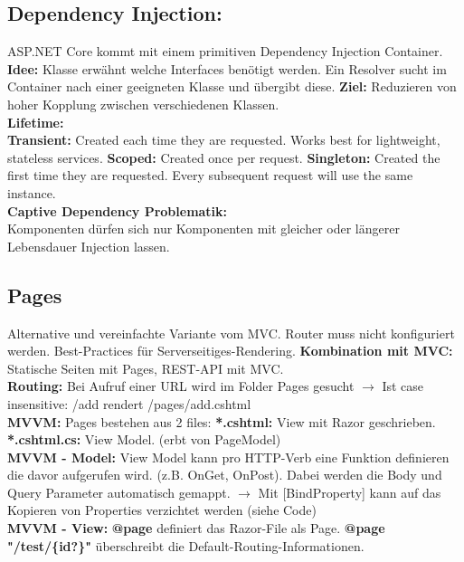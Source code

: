 \subsection{Dependency Injection:}
ASP.NET Core kommt mit einem primitiven Dependency Injection Container. \textbf{Idee:} Klasse erwähnt welche Interfaces benötigt werden. Ein Resolver sucht im Container nach einer geeigneten Klasse und übergibt diese. \textbf{Ziel:} Reduzieren von hoher Kopplung zwischen verschiedenen Klassen.\\
\textcolor{b}{\textbf{Lifetime:}}\\
\textbf{Transient:} Created each time they are requested. Works best for lightweight, stateless services. \textbf{Scoped:} Created once per request. \textbf{Singleton:} Created the first time they are requested. Every subsequent request will use the same instance.\\
\textcolor{b}{\textbf{Captive Dependency Problematik:}}\\
Komponenten dürfen sich nur Komponenten mit gleicher oder längerer Lebensdauer Injection lassen.
\subsection{Pages}
Alternative und vereinfachte Variante vom MVC. Router muss nicht konfiguriert werden. Best-Practices für Serverseitiges-Rendering. \textbf{Kombination mit MVC:} Statische Seiten mit Pages, REST-API mit MVC.\\
\textcolor{b}{\textbf{Routing:}} Bei Aufruf einer URL wird im Folder Pages gesucht $\rightarrow$ Ist case insensitive: \textcolor{b}{/add} rendert \textcolor{b}{/pages/add.cshtml}\\
\textcolor{b}{\textbf{MVVM:}} Pages bestehen aus 2 files: \textbf{*.cshtml:} View mit Razor geschrieben. \textbf{*.cshtml.cs:} View Model. (erbt von PageModel)\\
\textcolor{b}{\textbf{MVVM - Model:}} View Model kann pro HTTP-Verb eine Funktion definieren die davor aufgerufen wird. (z.B. OnGet, OnPost). Dabei werden die Body und Query Parameter automatisch gemappt. $\rightarrow$ Mit [BindProperty] kann auf das Kopieren von Properties verzichtet werden (siehe Code)\\
\textcolor{b}{\textbf{MVVM - View:}} \textbf{@page} definiert das Razor-File als Page. \textbf{@page "/test/\{id?\}"} überschreibt die Default-Routing-Informationen.
